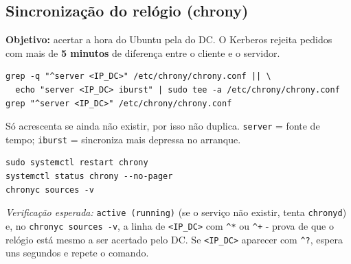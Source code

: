 
\subsection[Sincronização do relógio (chrony)]{Sincronização do relógio (chrony)}


\textbf{Objetivo:} acertar a hora do Ubuntu pela do DC. O Kerberos rejeita pedidos com mais de \textbf{5 minutos} de diferença entre o cliente e o servidor.


\begin{lstlisting}[style=bashstyle]
grep -q "^server <IP_DC>" /etc/chrony/chrony.conf || \
  echo "server <IP_DC> iburst" | sudo tee -a /etc/chrony/chrony.conf
grep "^server <IP_DC>" /etc/chrony/chrony.conf
\end{lstlisting}

Só acrescenta se ainda não existir, por isso não duplica. \texttt{server} = fonte de tempo; \texttt{iburst} = sincroniza mais depressa no arranque.


\begin{lstlisting}[style=bashstyle]
sudo systemctl restart chrony
systemctl status chrony --no-pager
chronyc sources -v
\end{lstlisting}

\emph{Verificação esperada:} \texttt{active (running)} (se o serviço não existir, tenta \texttt{chronyd}) e, no \texttt{chronyc sources -v}, a linha de \texttt{\textless{}IP\_DC\textgreater{}} com \texttt{\textasciicircum{}*} ou \texttt{\textasciicircum{}+} - prova de que o relógio está mesmo a ser acertado pelo DC. Se \texttt{\textless{}IP\_DC\textgreater{}} aparecer com \texttt{\textasciicircum{}?}, espera uns segundos e repete o comando.

